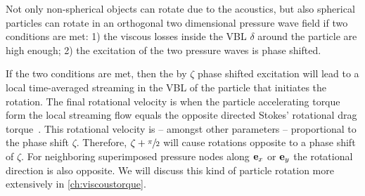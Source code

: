 Not only non-spherical objects can rotate due to the acoustics, but also 
spherical particles can rotate in an orthogonal two dimensional pressure wave 
field if two conditions are met: 1) the viscous losses inside the VBL $\delta$ 
around the particle are high enough; 2) the excitation of the two pressure 
waves is phase shifted.

If the two conditions are met, then the by $\zeta$ phase shifted excitation 
will lead to a local time-averaged streaming in the VBL of the particle that 
initiates the rotation. The final rotational velocity is when the particle 
accelerating torque form the local streaming flow equals the opposite directed 
Stokes' rotational drag torque~\cite{Lamprecht2017}. This rotational velocity 
is -- amongst other parameters -- proportional to the phase shift $\zeta$. 
Therefore, $\zeta + \sfrac{\pi}{2}$ will cause rotations opposite to a phase 
shift of $\zeta$. For neighboring superimposed pressure nodes along $\vb{e}_{x}$ or 
$\vb{e}_{y}$ the rotational direction is also opposite. We will discuss this kind of 
particle rotation more extensively in \cref{ch:viscoustorque}.

